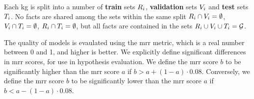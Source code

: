 Each \gls{kg} is split into a number of \textbf{train} sets $R_i$, \textbf{validation} sets $V_i$ and \textbf{test} sets $T_i$. No facts are shared among the sets within the same split $R_i \cap V_i = \emptyset$, $V_i \cap T_i = \emptyset$, $R_i \cap T_i = \emptyset$, but all facts are contained in the sets $R_i \cup V_i \cup T_i = \mathcal{G}$.

The quality of models is evaulated using the \gls{mrr} metric, which is a real number between 0 and 1, and higher is better.
We explicitly define significant differences in \gls{mrr} scores, for use in hypothesis evaluation. We define the \gls{mrr} score $b$ to be significantly higher than the \gls{mrr} score $a$ if $b > a + (1-a) \cdot 0.08$. Conversely, we define the \gls{mrr} score $b$ to be significantly lower than the \gls{mrr} score $a$ if $b < a - (1-a) \cdot 0.08$.

